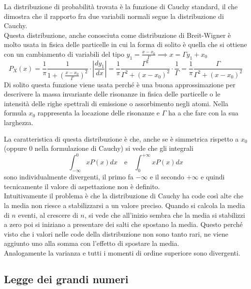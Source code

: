 \documentclass[openany,a4paper,12pt]{book}
\theoremstyle{remark}
\begin{document}
La distribuzione di probabilità trovata è la funzione di Cauchy standard, il che dimostra che il rapporto fra due variabili normali segue la distribuzione di Cauchy. \\
Questa distribuzione, anche conosciuta come distribuzione di Breit-Wigner è molto usata in fisica delle particelle in cui la forma di solito è quella che si ottiene con un cambiamento di variabili del tipo $y_1 = \frac{x - x_0}{\Gamma} \implies x = \Gamma y_1 + x_0$
\[
P_X(x) = \frac{1}{\pi} \frac{1}{1 + \left( \frac{x - x_0}{\Gamma} \right)^2} \cdot \left| \frac{dy_1}{dx} \right| = \frac{1}{\pi} \frac{\Gamma^2}{\Gamma^2 + (x - x_0)^2} \cdot \frac{1}{\Gamma} = \frac{1}{\pi} \frac{\Gamma}{\Gamma^2 + (x - x_0)^2}
\]
Di solito questa funzione viene usata perché è una buona approssimazione per descrivere la massa invariante delle risonanze in fisica delle particelle o le intensità delle righe spettrali di emissione o assorbimento negli atomi. Nella formula $x_0$ rappresenta la locazione delle risonanze e $\Gamma$ ha a che fare con la sua larghezza.

La caratteristica di questa distribuzione è che, anche se è simmetrica rispetto a $x_0$ (oppure 0 nella formulazione di Cauchy) si vede che gli integrali
\[
\int_{-\infty}^{0} x P(x) dx \quad \text{e} \quad \int_{0}^{+\infty} x P(x) dx
\]
sono individualmente divergenti, il primo fa $-\infty$ e il secondo $+\infty$ e quindi tecnicamente il valore di aspettazione non è definito. \\
Intuitivamente il problema è che la distribuzione di Cauchy ha code così alte che la media non riesce a stabilizzarsi a un valore preciso. Quando si calcola la media di $n$ eventi, al crescere di $n$, si vede che all'inizio sembra che la media si stabilizzi a zero poi si iniziano a presentare dei salti che spostano la media. Questo perché visto che i valori nelle code della distribuzione non sono tanto rari, ne viene aggiunto uno alla somma con l'effetto di spostare la media. \\
Analogamente la varianza e tutti i momenti di ordine superiore sono divergenti.


\subsection{Legge dei grandi numeri}
\end{document}
